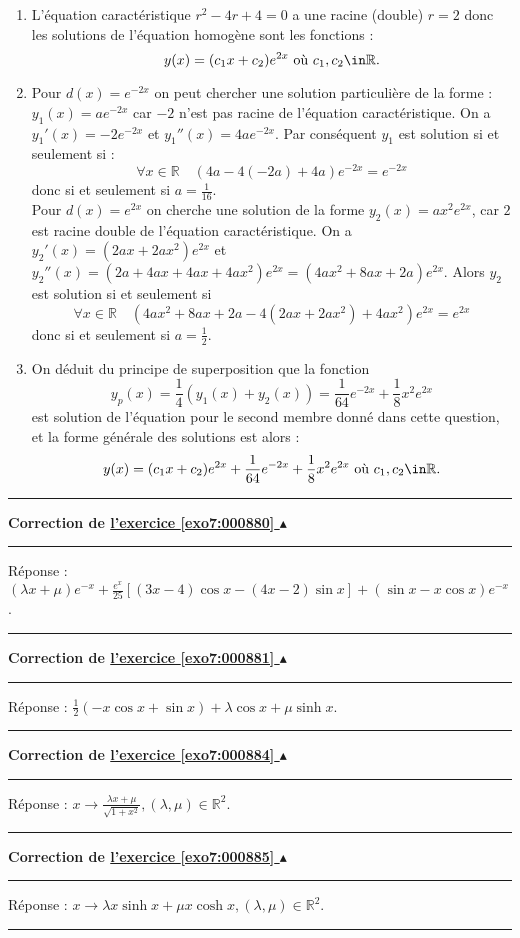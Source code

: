 \documentclass[11pt,a4paper]{article}
\newcommand{\Rr}{\mathbb{R}} \newcommand{\R}{\mathbb{R}}
\newcounter{exo}
\newcommand{\correction}[1]{\hypertarget{cor7:#1}{}\label{cor7:#1}{\bf Correction de \hyperlink{exo7:#1}{l'exercice \ref{exo7:#1} $\blacktriangle$}}\vspace{1mm}\hrule\vspace{1mm}}
\newcommand{\fincorrection}{\vspace{1mm}\hrule\vspace*{7mm}}
\begin{document}
\begin{enumerate}
    \item  L'\'equation caract\'eristique $r^2-4r+4=0$ a une racine (double) $r=2$
donc les solutions de l'\'equation homog\`ene sont les fonctions :
             $$ y(x) = (c_1x+c_2)e^{2x} \hbox{ o\`u } c_1,c_2 \in\R. $$
    \item Pour $d(x) = e^{-2x}$ on peut chercher une solution particuli\`ere de la forme : $ y_1(x)
= ae^{-2x} $ car $-2$ n'est pas racine de l'\'equation
caract\'eristique. On a $y_1'(x)= -2e^{-2x}$ et
$y_1''(x)=4ae^{-2x}$. Par cons\'equent $y_1$ est solution si et
seulement si :
             $$\forall x\in\R\quad  (4a -4(-2a)+4a)e^{-2x} = e^{-2x} $$
donc si et seulement si $ a =\frac{1}{16}$. \\ Pour $d(x) =e^{2x}$
on cherche une solution de la forme $y_2(x)=ax^2e^{2x}$, car $2$
est racine double de l'\'equation caract\'eristique. On a $y_2'(x)
= (2ax+2ax^2)e^{2x}$ et
$y_2''(x)=(2a+4ax+4ax+4ax^2)e^{2x}=(4ax^2+8ax+2a)e^{2x}$. Alors
$y_2$ est solution si et seulement si
$$\forall x\in\R\quad (4ax^2+8ax+2a-4(2ax+2ax^2)+4ax^2)e^{2x} =e^{2x} $$
donc si et seulement si $a=\frac{1}{2}$.
    \item  On d\'eduit du principe de superposition que la
fonction $$
y_p(x)=\frac{1}{4}(y_1(x)+y_2(x))=\frac{1}{64}e^{-2x}+\frac{1}{8}x^2e^{2x}$$
est solution de l'\'equation pour le second membre donn\'e dans
cette question, et la forme g\'en\'erale des solutions est alors :
$$ y(x)=(c_1x+c_2)e^{2x}+\frac{1}{64}e^{-2x}+\frac{1}{8}x^2e^{2x} \hbox{ o\`u }c_1,c_2\in\R.$$
\end{enumerate}
\fincorrection
\correction{000880}
R\'{e}ponse : $\left( \lambda x+\mu \right)
e^{-x}+\frac{e^{x}}{25}\left[ \left( 3x-4\right) \cos x-\left(
4x-2\right) \sin x\right] +\left( \sin x-x\cos x\right) e^{-x}$.
\fincorrection
\correction{000881}
R\'{e}ponse : $\frac{1}{2}\left( -x\cos x+\sin x\right) +\lambda
\cos x+\mu \sinh x.$
\fincorrection
\correction{000884}
R\'{e}ponse : $x\rightarrow \frac{\lambda x+\mu
}{\sqrt{1+x^{2}}},\left( \lambda ,\mu \right) \in {\Rr}^{2}.$
\fincorrection
\correction{000885}
R\'{e}ponse : $x\rightarrow \lambda x\sinh x+\mu x\cosh x,\left(
\lambda ,\mu \right) \in {\Rr}^{2}.$
\fincorrection
\end{document}
